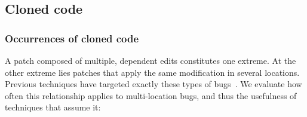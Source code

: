 \documentclass[10pt, conference]{IEEEtran}
\begin{document}
\subsection{Cloned code}
\label{sec:clones}

\subsubsection{Occurrences of cloned code}

A patch composed of multiple, dependent edits constitutes one
extreme. At the other extreme lies patches that apply the same modification in several locations. 
Previous techniques have targeted exactly these types of
bugs~\cite{wang2018,saha2019harnessing}.  We evaluate how often this relationship applies to
multi-location bugs, and thus the usefulness of techniques that assume it:


\end{document}
